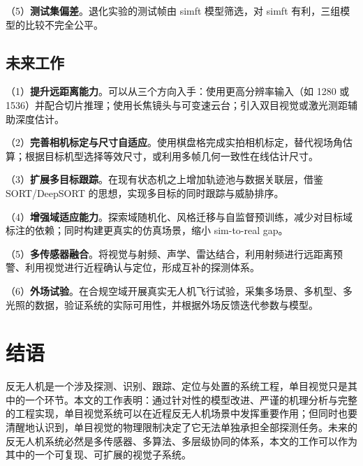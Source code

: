 （5）\textbf{测试集偏差}。退化实验的测试帧由 simft 模型筛选，对 simft 有利，三组模型的比较不完全公平。

\subsection{未来工作}

（1）\textbf{提升远距离能力}。可以从三个方向入手：使用更高分辨率输入（如 1280 或 1536）并配合切片推理；使用长焦镜头与可变速云台；引入双目视觉或激光测距辅助深度估计。

（2）\textbf{完善相机标定与尺寸自适应}。使用棋盘格完成实拍相机标定，替代视场角估算；根据目标机型选择等效尺寸，或利用多帧几何一致性在线估计尺寸。

（3）\textbf{扩展多目标跟踪}。在现有状态机之上增加轨迹池与数据关联层，借鉴 SORT/DeepSORT 的思想，实现多目标的同时跟踪与威胁排序。

（4）\textbf{增强域适应能力}。探索域随机化、风格迁移与自监督预训练，减少对目标域标注的依赖；同时构建更真实的仿真场景，缩小 sim-to-real gap。

（5）\textbf{多传感器融合}。将视觉与射频、声学、雷达结合，利用射频进行远距离预警、利用视觉进行近程确认与定位，形成互补的探测体系。

（6）\textbf{外场试验}。在合规空域开展真实无人机飞行试验，采集多场景、多机型、多光照的数据，验证系统的实际可用性，并根据外场反馈迭代参数与模型。

\section{结语}

反无人机是一个涉及探测、识别、跟踪、定位与处置的系统工程，单目视觉只是其中的一个环节。本文的工作表明：通过针对性的模型改进、严谨的机理分析与完整的工程实现，单目视觉系统可以在近程反无人机场景中发挥重要作用；但同时也要清醒地认识到，单目视觉的物理限制决定了它无法单独承担全部探测任务。未来的反无人机系统必然是多传感器、多算法、多层级协同的体系，本文的工作可以作为其中的一个可复现、可扩展的视觉子系统。

